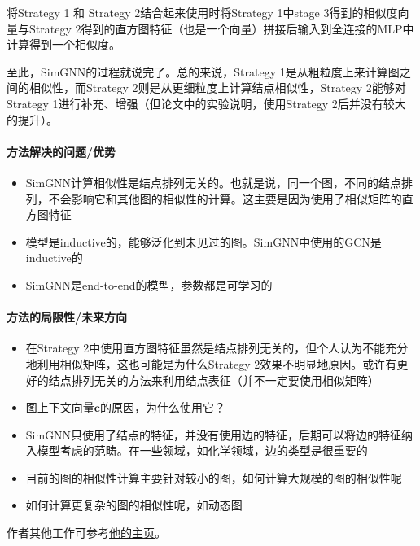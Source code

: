 将Strategy 1 和 Strategy 2结合起来使用时将Strategy 1中stage 3得到的相似度向量与Strategy 2得到的直方图特征（也是一个向量）拼接后输入到全连接的MLP中计算得到一个相似度。
\newline

至此，SimGNN的过程就说完了。总的来说，Strategy 1是从粗粒度上来计算图之间的相似性，而Strategy 2则是从更细粒度上计算结点相似性，Strategy 2能够对Strategy 1进行补充、增强（但论文中的实验说明，使用Strategy 2后并没有较大的提升）。

\paragraph{方法解决的问题/优势}
\begin{itemize}
	\item SimGNN计算相似性是结点排列无关的。也就是说，同一个图，不同的结点排列，不会影响它和其他图的相似性的计算。这主要是因为使用了相似矩阵的直方图特征
	\item 模型是inductive的，能够泛化到未见过的图。SimGNN中使用的GCN是inductive的
	\item SimGNN是end-to-end的模型，参数都是可学习的
\end{itemize}

\paragraph{方法的局限性/未来方向}
\begin{itemize}
	\item 在Strategy 2中使用直方图特征虽然是结点排列无关的，但个人认为不能充分地利用相似矩阵，这也可能是为什么Strategy 2效果不明显地原因。或许有更好的结点排列无关的方法来利用结点表征（并不一定要使用相似矩阵）
	\item 图上下文向量$\boldsymbol{c}$的原因，为什么使用它？
	\item SimGNN只使用了结点的特征，并没有{\color{red}使用边的特征}，后期可以将边的特征纳入模型考虑的范畴。在一些领域，如化学领域，边的类型是很重要的
	\item 目前的图的相似性计算主要针对较小的图，如何计算大规模的图的相似性呢
	\item {\color{red}如何计算更复杂的图的相似性呢，如动态图}
\end{itemize}

作者其他工作可参考\href{http://yunshengb.com/}{他的主页}。

